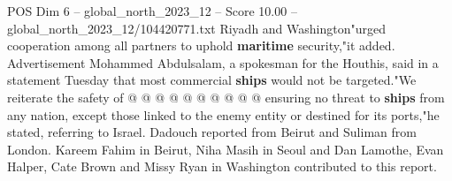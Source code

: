 \begin{textsample}{POS Dim 6 – global\_north\_2023\_12 – Score 10.00 – global\_north\_2023\_12/104420771.txt}
Riyadh and Washington"urged cooperation among all partners to uphold \textbf{maritime} security,"it added.
Advertisement Mohammed Abdulsalam, a spokesman for the Houthis, said in a statement Tuesday that most commercial \textbf{ships} would not be targeted."We reiterate the safety of @ @ @ @ @ @ @ @ @ @ ensuring no threat to \textbf{ships} from any nation, except those linked to the enemy entity or destined for its ports,"he stated, referring to Israel.
Dadouch reported from Beirut and Suliman from London.
Kareem Fahim in Beirut, Niha Masih in Seoul and Dan Lamothe, Evan Halper, Cate Brown and Missy Ryan in Washington contributed to this report.

\end{textsample}
